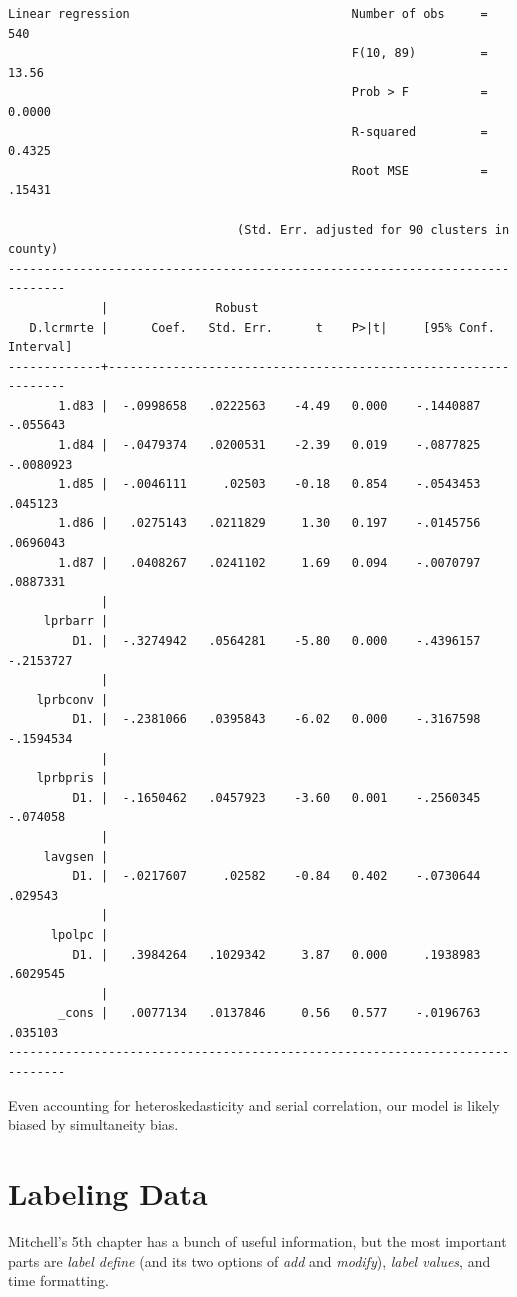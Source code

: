 \documentclass[
]{book}
\begin{document}
\begin{verbatim}
Linear regression                               Number of obs     =        540
                                                F(10, 89)         =      13.56
                                                Prob > F          =     0.0000
                                                R-squared         =     0.4325
                                                Root MSE          =     .15431

                                (Std. Err. adjusted for 90 clusters in county)
------------------------------------------------------------------------------
             |               Robust
   D.lcrmrte |      Coef.   Std. Err.      t    P>|t|     [95% Conf. Interval]
-------------+----------------------------------------------------------------
       1.d83 |  -.0998658   .0222563    -4.49   0.000    -.1440887    -.055643
       1.d84 |  -.0479374   .0200531    -2.39   0.019    -.0877825   -.0080923
       1.d85 |  -.0046111     .02503    -0.18   0.854    -.0543453     .045123
       1.d86 |   .0275143   .0211829     1.30   0.197    -.0145756    .0696043
       1.d87 |   .0408267   .0241102     1.69   0.094    -.0070797    .0887331
             |
     lprbarr |
         D1. |  -.3274942   .0564281    -5.80   0.000    -.4396157   -.2153727
             |
    lprbconv |
         D1. |  -.2381066   .0395843    -6.02   0.000    -.3167598   -.1594534
             |
    lprbpris |
         D1. |  -.1650462   .0457923    -3.60   0.001    -.2560345    -.074058
             |
     lavgsen |
         D1. |  -.0217607     .02582    -0.84   0.402    -.0730644     .029543
             |
      lpolpc |
         D1. |   .3984264   .1029342     3.87   0.000     .1938983    .6029545
             |
       _cons |   .0077134   .0137846     0.56   0.577    -.0196763     .035103
------------------------------------------------------------------------------
\end{verbatim}

Even accounting for heteroskedasticity and serial correlation, our model is likely biased by simultaneity bias.

\chapter{Labeling Data}\label{labeling-data}

Mitchell's 5th chapter has a bunch of useful information, but the most
important parts are \emph{label define} (and its two options of \emph{add} and \emph{modify}), \emph{label values}, and time formatting.
\end{document}
